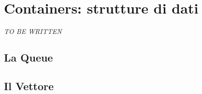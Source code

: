 \chapter{Containers: strutture di dati}
\emph{TO BE WRITTEN}



		
\section{La Queue}
\section{Il Vettore}